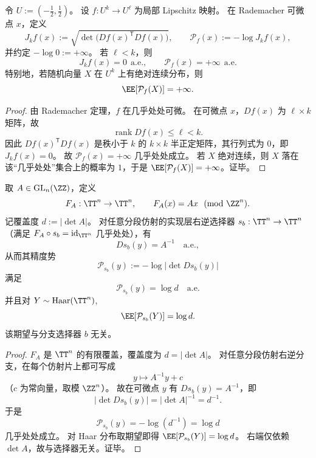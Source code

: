 \begin{theorem}[有限精度势约束下的圆维单调性]\label{thm:conclusion-jacobian-potential-dimension-monotonicity}
令 \(U:=(-\tfrac12,\tfrac12)\)。
设 \(f:U^k\to U^\ell\) 为局部 Lipschitz 映射。
在 Rademacher 可微点 \(x\)，定义
\[
J_k f(x):=\sqrt{\det\!\bigl(Df(x)^{\mathsf T}Df(x)\bigr)},
\qquad
\mathcal P_f(x):=-\log J_k f(x),
\]
并约定 \(-\log 0:=+\infty\)。
若 \(\ell<k\)，则
\[
J_k f(x)=0\ \ \text{a.e.},\qquad
\mathcal P_f(x)=+\infty\ \ \text{a.e.}
\]
特别地，若随机向量 \(X\) 在 \(U^k\) 上有绝对连续分布，则
\[
\EE[\mathcal P_f(X)]=+\infty.
\]
\end{theorem}
\begin{proof}
由 Rademacher 定理，\(f\) 在几乎处处可微。
在可微点 \(x\)，\(Df(x)\) 为 \(\ell\times k\) 矩阵，故
\[
\operatorname{rank}Df(x)\le \ell<k.
\]
因此 \(Df(x)^{\mathsf T}Df(x)\) 是秩小于 \(k\) 的 \(k\times k\) 半正定矩阵，其行列式为 \(0\)，即 \(J_k f(x)=0\)。
故 \(\mathcal P_f(x)=+\infty\) 几乎处处成立。
若 \(X\) 绝对连续，则 \(X\) 落在该“几乎处处”集合上的概率为 \(1\)，于是 \(\EE[\mathcal P_f(X)]=+\infty\)。证毕。
\end{proof}

\begin{theorem}\label{thm:conclusion-torus-cover-degree-potential-identity}
取 \(A\in \mathrm{GL}_n(\ZZ)\)，定义
\[
F_A:\TT^n\to \TT^n,\qquad F_A(x)=Ax\ \ (\mathrm{mod}\ \ZZ^n).
\]
记覆盖度 \(d:=|\det A|\)。
对任意分段仿射的实现层右逆选择器 \(s_b:\TT^n\to\TT^n\)（满足 \(F_A\circ s_b=\mathrm{id}_{\TT^n}\) 几乎处处），有
\[
Ds_b(y)=A^{-1}\quad\text{a.e.},
\]
从而其精度势
\[
\mathcal P_{s_b}(y):=-\log|\det Ds_b(y)|
\]
满足
\[
\mathcal P_{s_b}(y)=\log d\quad\text{a.e.}
\]
并且对 \(Y\sim\mathrm{Haar}(\TT^n)\),
\[
\EE[\mathcal P_{s_b}(Y)]=\log d.
\]
该期望与分支选择器 \(b\) 无关。
\end{theorem}
\begin{proof}
\(F_A\) 是 \(\TT^n\) 的有限覆盖，覆盖度为 \(d=|\det A|\)。
对任意分段仿射右逆分支，在每个仿射片上都可写成
\[
y\longmapsto A^{-1}y+c
\]
（\(c\) 为常向量，取模 \(\ZZ^n\)）。
故在可微点 \(y\) 有 \(Ds_b(y)=A^{-1}\)，即
\[
|\det Ds_b(y)|=|\det A|^{-1}=d^{-1}.
\]
于是
\[
\mathcal P_{s_b}(y)=-\log(d^{-1})=\log d
\]
几乎处处成立。
对 Haar 分布取期望即得 \(\EE[\mathcal P_{s_b}(Y)]=\log d\)。
右端仅依赖 \(\det A\)，故与选择器无关。证毕。
\end{proof}

